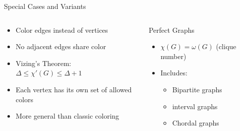 \documentclass{beamer}
\begin{document}
\begin{frame}{Special Cases and Variants}
    \begin{columns}[T]
        \begin{column}{0.5\textwidth}
            \textbf{\color{myred}{Edge Coloring}}
                \begin{itemize}
                    \item Color edges instead of vertices
                    \item No adjacent edges share color
                    \item Vizing's Theorem: $\Delta \leq \chi'(G) \leq \Delta+1$
                \end{itemize}
                
            \textbf{\color{myred}{List Coloring}}
                \begin{itemize}
                    \item Each vertex has its own set of allowed colors
                    \item More general than classic coloring
                \end{itemize}
        \end{column}
        
        \begin{column}{0.5\textwidth}
            \begin{alertblock}{Perfect Graphs}
                \begin{itemize}
                    \item $\chi(G) = \omega(G)$ (clique number)
                    \item Includes:
                    \begin{itemize}
                        \item Bipartite graphs
                        \item interval graphs
                        \item Chordal graphs
                    \end{itemize}
                \end{itemize}
            \end{alertblock}
            
            \begin{center}
            \end{center}
        \end{column}
    \end{columns}
    

\end{frame}
\end{document}
